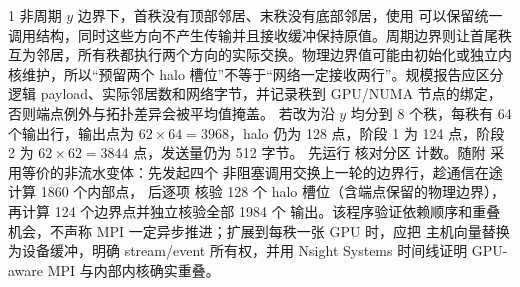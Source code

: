 \begin{solutionexercise}{1}
非周期 $y$ 边界下，首秩没有顶部邻居、末秩没有底部邻居，使用  可以保留统一调用结构，同时这些方向不产生传输并且接收缓冲保持原值。周期边界则让首尾秩互为邻居，所有秩都执行两个方向的实际交换。物理边界值可能由初始化或独立内核维护，所以“预留两个 halo 槽位”不等于“网络一定接收两行”。规模报告应区分逻辑 payload、实际邻居数和网络字节，并记录秩到 GPU/NUMA 节点的绑定，否则端点例外与拓扑差异会被平均值掩盖。
\variantheading 若改为沿 $y$ 均分到 8 个秩，每秩有 64 个输出行，输出点为 $62\times64=3968$，halo 仍为 128 点，阶段 1 为 124 点，阶段 2 为 $62\times62=3844$ 点，发送量仍为 512 字节。
\practiceheading 先运行  核对分区
计数。随附  采用等价的非流水变体：先发起四个
非阻塞调用交换上一轮的边界行，趁通信在途计算 1860 个内部点， 后逐项
核验 128 个 halo 槽位（含端点保留的物理边界），再计算 124 个边界点并独立核验全部 1984 个
输出。该程序验证依赖顺序和重叠机会，不声称 MPI 一定异步推进；扩展到每秩一张 GPU 时，应把
主机向量替换为设备缓冲，明确 stream/event 所有权，并用 Nsight Systems 时间线证明 GPU-aware
MPI 与内部内核确实重叠。
\end{solutionexercise}

